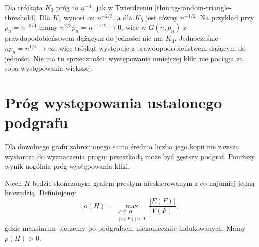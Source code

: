 \begin{przyklad}
\label{ex:tg-random-clique-threshold}
Dla trójkąta $K_3$ próg to $n^{-1}$,
jak w Twierdzeniu
\ref{thm:tg-random-triangle-threshold}.
Dla $K_4$ wynosi on $n^{-2/3}$,
a dla $K_5$ jest równy $n^{-1/2}$.
Na przykład przy
$p_n=n^{-3/4}$ mamy
$n^{2/3}p_n=n^{-1/12}\to0$,
więc w $G(n,p_n)$ z prawdopodobieństwem
dążącym do jedności nie ma $K_4$.
Jednocześnie $np_n=n^{1/4}\to\infty$,
więc trójkąt występuje
z prawdopodobieństwem dążącym
do jedności. Nie ma tu sprzeczności:
występowanie mniejszej kliki
nie pociąga za sobą
występowania większej.
\end{przyklad}

\section{Próg występowania ustalonego podgrafu}
\label{sec:tg-random-fixed-subgraph}

Dla dowolnego grafu zabronionego sama średnia
liczba jego kopii nie zawsze wystarcza do
wyznaczenia progu: przeszkodą może być gęstszy
podgraf. Poniższy wynik uogólnia próg występowania
kliki.

\begin{definicja}
\label{def:tg-random-max-density}
Niech $H$ będzie skończonym grafem prostym
nieskierowanym z co najmniej jedną krawędzią.
Definiujemy
\[
\rho(H)=\max_{\substack{F\subseteq H\\ |V(F)|>0}}
\frac{|E(F)|}{|V(F)|},
\]
gdzie maksimum bierzemy po podgrafach, niekoniecznie
indukowanych. Mamy $\rho(H)>0$.
\end{definicja}

